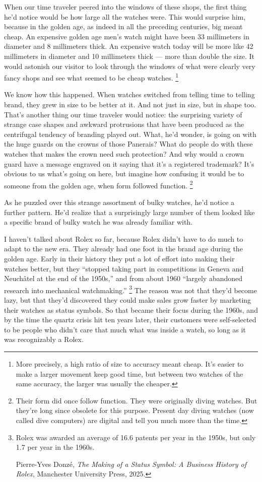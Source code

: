 When our time traveler peered into the windows of these shops, the first
thing he'd notice would be how large all the watches were. This would
surprise him, because in the golden age, as indeed in all the preceding
centuries, big meant cheap. An expensive golden age men's watch might
have been 33 millimeters in diameter and 8 millimeters thick. An
expensive watch today will be more like 42 millimeters in diameter and
10 millimeters thick --- more than double the size. It would astonish
our visitor to look through the windows of what were clearly very fancy
shops and see what seemed to be cheap watches. \footnote{More precisely, a high ratio of size to accuracy meant cheap.
It's easier to make a larger movement keep good time, but between two
watches of the same accuracy, the larger was usually the cheaper.}

We know how this happened. When watches switched from telling time to
telling brand, they grew in size to be better at it. And not just in
size, but in shape too. That's another thing our time traveler would
notice: the surprising variety of strange case shapes and awkward
protrusions that have been produced as the centrifugal tendency of
branding played out. What, he'd wonder, is going on with the huge guards
on the crowns of those Panerais? What do people do with these watches
that makes the crown need such protection? And why would a crown guard
have a message engraved on it saying that it's a registered trademark?
It's obvious to us what's going on here, but imagine how confusing it
would be to someone from the golden age, when form followed function.
\footnote{Their form did once follow function. They were originally
diving watches. But they're long since obsolete for this purpose.
Present day diving watches (now called dive computers) are digital and
tell you much more than the time.}

As he puzzled over this strange assortment of bulky watches, he'd notice
a further pattern. He'd realize that a surprisingly large number of them
looked like a specific brand of bulky watch he was already familiar
with.

I haven't talked about Rolex so far, because Rolex didn't have to do
much to adapt to the new era. They already had one foot in the brand age
during the golden age. Early in their history they put a lot of effort
into making their watches better, but they ``stopped taking part in
competitions in Geneva and Neuchâtel at the end of the 1950s,'' and from
about 1960 ``largely abandoned research into mechanical watchmaking.''
\footnote{Rolex was awarded an average of 16.6 patents per year in the
1950s, but only 1.7 per year in the 1960s.

Pierre-Yves Donzé, \emph{The Making of a Status Symbol: A Business
History of Rolex}, Manchester University Press, 2025.} The reason was not that they'd become lazy,
but that they'd discovered they could make sales grow faster by
marketing their watches as status symbols. So that became their focus
during the 1960s, and by the time the quartz crisis hit ten years later,
their customers were self-selected to be people who didn't care that
much what was inside a watch, so long as it was recognizably a Rolex.

